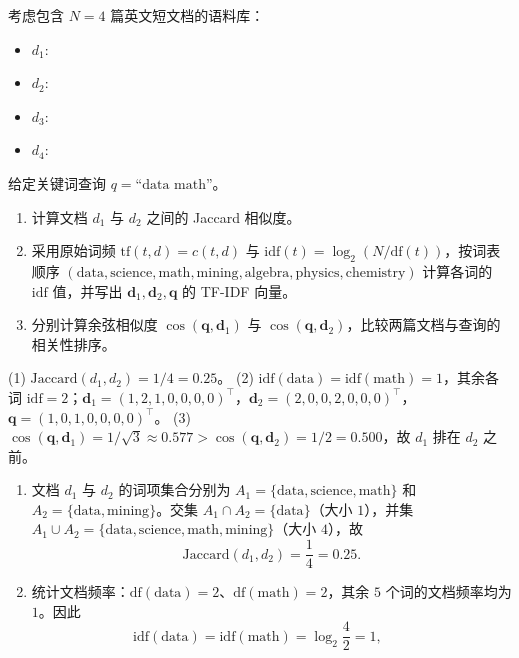 \begin{exercise}[title={Jaccard 相似度与 TF-IDF 余弦检索手算},level=standard,points=15,tags={Jaccard,TF-IDF,余弦相似度}]\label{ex:ch07-tfidf-calc}
考虑包含 $N=4$ 篇英文短文档的语料库：
\begin{itemize}
  \item $d_1$: 
  \item $d_2$: 
  \item $d_3$: 
  \item $d_4$: 
\end{itemize}
给定关键词查询 $q=\text{``data math''}$。
\begin{enumerate}
  \item 计算文档 $d_1$ 与 $d_2$ 之间的 Jaccard 相似度。
  \item 采用原始词频 $\mathrm{tf}(t,d)=c(t,d)$ 与 $\mathrm{idf}(t)=\log_2\!\left(N/\mathrm{df}(t)\right)$，按词表顺序 $(\text{data},\text{science},\text{math},\text{mining},\text{algebra},\text{physics},\text{chemistry})$ 计算各词的 $\mathrm{idf}$ 值，并写出 $\mathbf{d}_1, \mathbf{d}_2, \mathbf{q}$ 的 TF-IDF 向量。
  \item 分别计算余弦相似度 $\cos(\mathbf{q},\mathbf{d}_1)$ 与 $\cos(\mathbf{q},\mathbf{d}_2)$，比较两篇文档与查询的相关性排序。
\end{enumerate}
\begin{answer}
(1) $\mathrm{Jaccard}(d_1,d_2)=1/4=0.25$。
(2) $\mathrm{idf}(\text{data})=\mathrm{idf}(\text{math})=1$，其余各词 $\mathrm{idf}=2$；$\mathbf{d}_1=(1,2,1,0,0,0,0)^\top$，$\mathbf{d}_2=(2,0,0,2,0,0,0)^\top$，$\mathbf{q}=(1,0,1,0,0,0,0)^\top$。
(3) $\cos(\mathbf{q},\mathbf{d}_1)=1/\sqrt{3}\approx 0.577 > \cos(\mathbf{q},\mathbf{d}_2)=1/2=0.500$，故 $d_1$ 排在 $d_2$ 之前。
\end{answer}
\begin{solution}
\begin{enumerate}
  \item 文档 $d_1$ 与 $d_2$ 的词项集合分别为 $A_1=\{\text{data},\text{science},\text{math}\}$ 和 $A_2=\{\text{data},\text{mining}\}$。交集 $A_1\cap A_2=\{\text{data}\}$（大小 $1$），并集 $A_1\cup A_2=\{\text{data},\text{science},\text{math},\text{mining}\}$（大小 $4$），故
  \[
    \mathrm{Jaccard}(d_1,d_2) = \frac{1}{4} = 0.25.
  \]
  \item 统计文档频率：$\mathrm{df}(\text{data})=2$、$\mathrm{df}(\text{math})=2$，其余 $5$ 个词的文档频率均为 $1$。因此
  \[
    \mathrm{idf}(\text{data})=\mathrm{idf}(\text{math})=\log_2\frac{4}{2}=1,\qquad
\]
\end{enumerate}
\end{solution}
\end{exercise}
